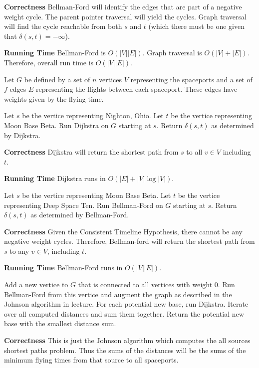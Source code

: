\documentclass[12pt,twoside]{article}
\begin{document}
\begin{problems}
\begin{problemparts}
{\bf Correctness} Bellman-Ford will identify the edges that are part of a
negative weight cycle. The parent pointer traversal will yield the cycles.
Graph traversal will find the cycle reachable from both $s$ and $t$ (which
there must be one given that $\delta(s, t) = - \infty$).

{\bf Running Time} Bellman-Ford is $O(|V||E|)$. Graph traversal is $O(|V| +
|E|)$. Therefore, overall run time is $O(|V||E|)$.

\end{problemparts}

\newpage
\problem Let $G$ be defined by a set of $n$ vertices $V$ representing the
spaceports and a set of $f$ edges $E$ representing the flights between each
spaceport. These edges have weights given by the flying time.

\begin{problemparts}
 Let $s$ be the vertice representing Nighton,
Ohio. Let $t$ be the vertice representing Moon Base Beta. Run Dijkstra on $G$
starting at $s$. Return $\delta(s, t)$ as determined by Dijkstra.

{\bf Correctness} Dijkstra will return the shortest path from $s$ to all $v
\in V$ including $t$.

{\bf Running Time} Dijkstra runs in $O(|E| + |V| \log |V|)$.

 Let $s$ be the vertice representing Moon Base
Beta. Let $t$ be the vertice representing Deep Space Ten. Run Bellman-Ford on
$G$ starting at $s$. Return $\delta(s, t)$ as determined by Bellman-Ford.

{\bf Correctness} Given the Consistent Timeline Hypothesis, there cannot be
any negative weight cycles. Therefore, Bellman-ford will return the shortest
path from $s$ to any $v \in V$, including $t$.

{\bf Running Time} Bellman-Ford runs in $O(|V||E|)$.

 Add a new vertice to $G$ that is connected to
all vertices with weight $0$. Run Bellman-Ford from this vertice and augment
the graph as described in the Johnson algorithm in lecture. For each
potential new base, run Dijkstra. Iterate over all computed distances and sum
them together. Return the potential new base with the smallest distance sum.

{\bf Correctness} This is just the Johnson algorithm which computes the all
sources shortest paths problem. Thus the sums of the distances will be the
sums of the minimum flying times from that source to all spaceports.


\end{problemparts}
\end{problems}
\end{document}
